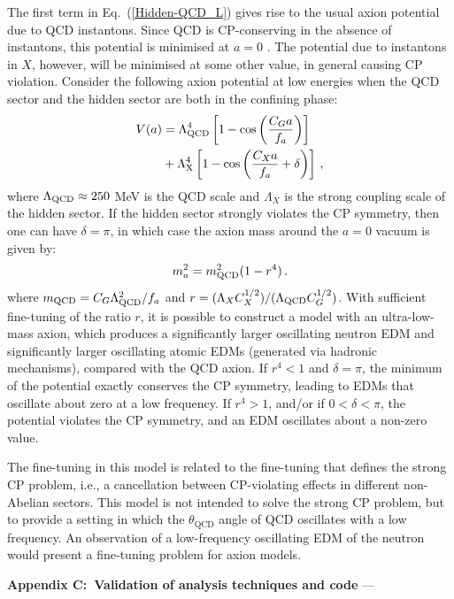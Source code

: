 The first term in Eq.~(\ref{Hidden-QCD_L}) gives rise to the usual axion potential due to QCD instantons.
Since QCD is CP-conserving in the absence of instantons, this potential is minimised at $a=0$ \cite{Vafa1984}.
The potential due to instantons in $X$, however, will be minimised at some other value, in general causing CP violation.
Consider the following axion potential at low energies when the QCD sector and the hidden sector are both in the confining phase:
\begin{align}
V(a) &= \Lambda_{\rm QCD}^4 \left[1- \cos \left(\frac{C_G a}{f_a}\right) \right] \notag \\
&+ \Lambda_{\rm X}^4 \left[1- \cos \left(\frac{C_X a}{f_a} + \delta \right)\right] \, ,
\end{align}
where $\Lambda_{\rm QCD} \approx 250$ MeV is the QCD scale and $\Lambda_X$ is the strong coupling scale of the hidden sector.
If the hidden sector strongly violates the CP symmetry, then one can have $\delta=\pi$, %
in which case the axion mass around the $a=0$ vacuum is given by:
\begin{equation}
m_a^2 = m_{\rm QCD}^2 (1-r^4) \, .
\end{equation}
where $m_{\rm QCD} = C_G\Lambda_{\rm QCD}^2/f_a$ and $r=(\Lambda_X C_X^{1/2})/(\Lambda_{\rm QCD}C_G^{1/2})$.
With sufficient fine-tuning of the ratio $r$, it is possible to construct a model with an ultra-low-mass axion, which produces a significantly larger oscillating neutron EDM and significantly larger oscillating atomic EDMs (generated via hadronic mechanisms), compared with the QCD axion.
If $r^4<1$ and $\delta=\pi$, the minimum of the potential exactly conserves the CP symmetry, leading to EDMs that oscillate about zero at a low frequency.
If $r^4>1$, and/or if $0<\delta<\pi$, the potential violates the CP symmetry, and an EDM oscillates about a non-zero value.

The fine-tuning in this model is related to the fine-tuning that defines the strong CP problem, i.e., a cancellation between CP-violating effects in different non-Abelian sectors.
This model is not intended to solve the strong CP problem, but to provide a setting in which the $\theta_{\textrm{QCD}}$ angle of QCD oscillates with a low frequency.
An observation of a low-frequency oscillating EDM of the neutron would present a fine-tuning problem for axion models.




\textbf{Appendix C:~Validation of analysis techniques and code} ---

